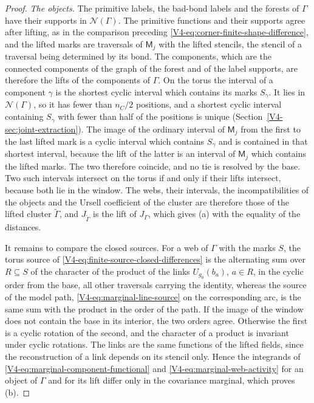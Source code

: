 \documentclass[11pt]{article}
\numberwithin{equation}{section}
\theoremstyle{remark}
\theoremstyle{plain}
\begin{document}
\begin{proof}
\emph{The objects.} The primitive labels, the bad-bond labels and the forests of $\Gamma$ have their supports in $\mathscr N(\Gamma)$. The primitive functions and their supports agree after lifting, as in the comparison preceding \eqref{V4-eq:corner-finite-shape-difference}, and the lifted marks are traversals of $\mathsf M_j$ with the lifted stencils, the stencil of a traversal being determined by its bond. The components, which are the connected components of the graph of the forest and of the label supports, are therefore the lifts of the components of $\Gamma$. On the torus the interval of a component $\gamma$ is the shortest cyclic interval which contains its marks $S_{\gamma}$. It lies in $\mathscr N(\Gamma)$, so it has fewer than $n_C/2$ positions, and a shortest cyclic interval containing $S_{\gamma}$ with fewer than half of the positions is unique (Section~\ref{V4-sec:joint-extraction}). The image of the ordinary interval of $\mathsf M_j$ from the first to the last lifted mark is a cyclic interval which contains $S_{\gamma}$ and is contained in that shortest interval, because the lift of the latter is an interval of $\mathsf M_j$ which contains the lifted marks. The two therefore coincide, and no tie is resolved by the base. Two such intervals intersect on the torus if and only if their lifts intersect, because both lie in the window. The webs, their intervals, the incompatibilities of the objects and the Ursell coefficient of the cluster are therefore those of the lifted cluster $\widetilde\Gamma$, and $J_{\widetilde\Gamma}$ is the lift of $J_{\Gamma}$, which gives (a) with the equality of the distances.

It remains to compare the closed sources. For a web of $\Gamma$ with the marks $S$, the torus source of \eqref{V4-eq:finite-source-closed-differences} is the alternating sum over $R\subseteq S$ of the character of the product of the links $U_{g_0}(b_a)$, $a\in R$, in the cyclic order from the base, all other traversals carrying the identity, whereas the source of the model path, \eqref{V4-eq:marginal-line-source} on the corresponding arc, is the same sum with the product in the order of the path. If the image of the window does not contain the base in its interior, the two orders agree. Otherwise the first is a cyclic rotation of the second, and the character of a product is invariant under cyclic rotations. The links are the same functions of the lifted fields, since the reconstruction of a link depends on its stencil only. Hence the integrands of \eqref{V4-eq:marginal-component-functional} and \eqref{V4-eq:marginal-web-activity} for an object of $\Gamma$ and for its lift differ only in the covariance marginal, which proves (b).


\end{proof}
\end{document}
